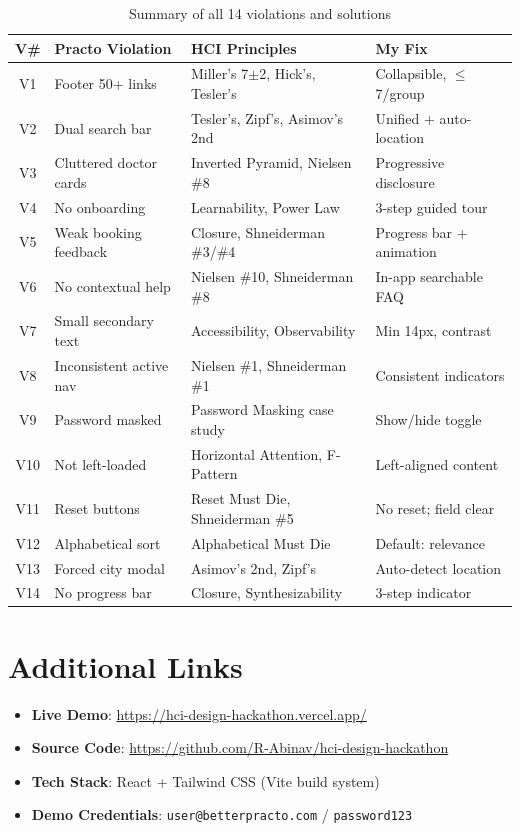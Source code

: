 \documentclass[12pt, a4paper]{article}
\begin{document}
\begin{table}[H]
\centering
\small
\renewcommand{\arraystretch}{1.3}
\begin{tabularx}{\textwidth}{|c|X|X|X|}
\hline
\textbf{V\#} & \textbf{Practo Violation} & \textbf{HCI Principles} & \textbf{My Fix} \\
\hline
V1 & Footer 50+ links & Miller's 7$\pm$2, Hick's, Tesler's & Collapsible, $\leq$7/group \\
V2 & Dual search bar & Tesler's, Zipf's, Asimov's 2nd & Unified + auto-location \\
V3 & Cluttered doctor cards & Inverted Pyramid, Nielsen \#8 & Progressive disclosure \\
V4 & No onboarding & Learnability, Power Law & 3-step guided tour \\
V5 & Weak booking feedback & Closure, Shneiderman \#3/\#4 & Progress bar + animation \\
V6 & No contextual help & Nielsen \#10, Shneiderman \#8 & In-app searchable FAQ \\
V7 & Small secondary text & Accessibility, Observability & Min 14px, contrast \\
V8 & Inconsistent active nav & Nielsen \#1, Shneiderman \#1 & Consistent indicators \\
V9 & Password masked & Password Masking case study & Show/hide toggle \\
V10 & Not left-loaded & Horizontal Attention, F-Pattern & Left-aligned content \\
V11 & Reset buttons & Reset Must Die, Shneiderman \#5 & No reset; field clear \\
V12 & Alphabetical sort & Alphabetical Must Die & Default: relevance \\
V13 & Forced city modal & Asimov's 2nd, Zipf's & Auto-detect location \\
V14 & No progress bar & Closure, Synthesizability & 3-step indicator \\
\hline
\end{tabularx}
\caption{Summary of all 14 violations and solutions}
\end{table}

\section{Additional Links}

\begin{itemize}[leftmargin=*]
    \item \textbf{Live Demo}: \url{https://hci-design-hackathon.vercel.app/}
    \item \textbf{Source Code}: \url{https://github.com/R-Abinav/hci-design-hackathon}
    \item \textbf{Tech Stack}: React + Tailwind CSS (Vite build system)
    \item \textbf{Demo Credentials}: \texttt{user@betterpracto.com} / \texttt{password123}
\end{itemize}
\end{document}
